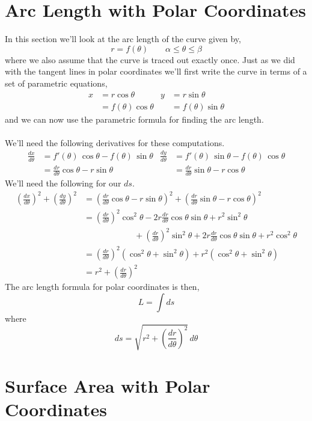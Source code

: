 \documentclass[10pt,reqno]{book}
\theoremstyle{definition}
\begin{document}
	
	\section{Arc Length with Polar Coordinates}
	
	In this section we'll look at the arc length of the curve given by,
	\[ r = f(\theta) \qquad \alpha \leq \theta \leq \beta \]
	where we also assume that the curve is traced out exactly once. Just as we did with the tangent lines in polar coordinates we’ll first write the curve in terms of a set of parametric equations,
	\begin{align*}
		x &= r\cos\theta   &    y &= r\sin\theta\\
		&= f(\theta)\cos\theta  &   &= f(\theta)\sin\theta
	\end{align*}
	and we can now use the parametric formula for finding the arc length.\\ \\
	We'll need the following derivatives for these computations.
	\begin{align*}
		\frac{dx}{d\theta} & = f'(\theta)\,\cos\theta - f(\theta)\,\sin\theta & \frac{dy}{d\theta} & = f'(\theta)\,\sin\theta - f(\theta)\,\cos\theta \\
		& = \frac{dr}{d\theta} \cos\theta - r\sin\theta    &                    & = \frac{dr}{d\theta} \sin\theta - r\cos\theta
	\end{align*}
	We'll need the following for our $ ds $.
	\begin{align*}
		\left(\frac{dx}{d\theta} \right)^2 + \left( \frac{dy}{d\theta} \right)^2 &= \left( \frac{dr}{d\theta} \cos\theta - r\sin\theta \right)^2 + \left( \frac{dr}{d\theta} \sin\theta - r\cos\theta \right)^2\\
		&= \left(\frac{dr}{d\theta}\right)^2 \cos^2\theta - 2r\frac{dr}{d\theta}\cos\theta \sin\theta + r^2\sin^2\theta \\
		& \qquad \qquad  \qquad + \left(\frac{dr}{d\theta} \right)^2 \sin^2\theta + 2r\frac{dr}{d\theta} \cos\theta \sin\theta + r^2\cos^2\theta \\
		&= \left( \frac{dr}{d\theta}\right)^2 (\cos^2\theta + \sin^2\theta) + r^2(\cos^2\theta + \sin^2\theta) \\
		&= r^2 + \left( \frac{dr}{d\theta}\right)^2
	\end{align*}
	The arc length formula for polar coordinates is then,
	\[ L = \int ds \]
	where
	\[ ds = \sqrt{r^2 + \left( \frac{dr}{d\theta}\right)^2} \, d\theta \]
	
	
	\section{Surface Area with Polar Coordinates}
	
\end{document}
